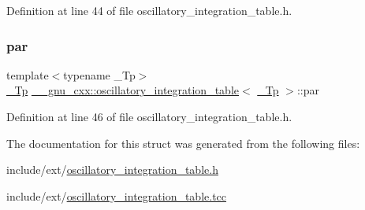 Definition at line 44 of file oscillatory\+\_\+integration\+\_\+table.\+h.

\mbox{\label{struct____gnu__cxx_1_1oscillatory__integration__table_ae98255b8cccea27dde0047c45cfc2ac6}} 
\subsubsection{\texorpdfstring{par}{par}}
{\footnotesize\ttfamily template$<$typename \+\_\+\+Tp$>$ \\
\hyperlink{namespace____gnu__cxx_a3b19a9c800ca194374ef9172290f7d79}{\+\_\+\+Tp} \hyperlink{struct____gnu__cxx_1_1oscillatory__integration__table}{\+\_\+\+\_\+gnu\+\_\+cxx\+::oscillatory\+\_\+integration\+\_\+table}$<$ \hyperlink{namespace____gnu__cxx_a3b19a9c800ca194374ef9172290f7d79}{\+\_\+\+Tp} $>$\+::par}



Definition at line 46 of file oscillatory\+\_\+integration\+\_\+table.\+h.



The documentation for this struct was generated from the following files\+:\begin{DoxyCompactItemize}
\item 
include/ext/\hyperlink{oscillatory__integration__table_8h}{oscillatory\+\_\+integration\+\_\+table.\+h}\item 
include/ext/\hyperlink{oscillatory__integration__table_8tcc}{oscillatory\+\_\+integration\+\_\+table.\+tcc}\end{DoxyCompactItemize}

